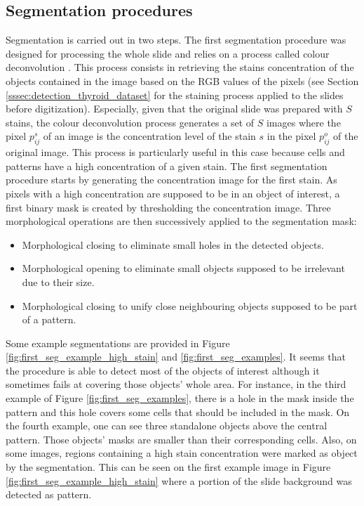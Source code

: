 \subsection{Segmentation procedures}
\label{ssec:segmentation_proc}
Segmentation is carried out in two steps. The first segmentation procedure was designed for processing the whole slide and relies on a process called colour deconvolution \cite{ruifrok2001quantification}. This process consists in retrieving the stains concentration of the objects contained in the image based on the RGB values of the pixels (see Section \ref{sssec:detection_thyroid_dataset} for the staining process applied to the slides before digitization). Especially, given that the original slide was prepared with $S$ stains, the colour deconvolution process generates a set of $S$ images where the pixel $p^s_{ij}$ of an image is the concentration level of the stain $s$ in the pixel $p^o_{ij}$ of the original image. This process is particularly useful in this case because cells and patterns have a high concentration of a given stain. The first segmentation procedure starts by generating the concentration image for the first stain. As pixels with a high concentration are supposed to be in an object of interest, a first binary mask is created by thresholding the concentration image. Three morphological operations are then successively applied to the segmentation mask:

\begin{itemize}
	\item Morphological closing to eliminate small holes in the detected objects.
	\item Morphological opening to eliminate small objects supposed to be irrelevant due to their size.
	\item Morphological closing to unify close neighbouring objects supposed to be part of a pattern.
\end{itemize}

Some example segmentations are provided in Figure \ref{fig:first_seg_example_high_stain} and \ref{fig:first_seg_examples}. It seems that the procedure is able to detect most of the objects of interest although it sometimes fails at covering those objects' whole area. For instance, in the third example of Figure \ref{fig:first_seg_examples}, there is a hole in the mask inside the pattern and this hole covers some cells that should be included in the mask. On the fourth example, one can see three standalone objects above the central pattern. Those objects' masks are smaller than their corresponding cells. Also, on some images, regions containing a high stain concentration were marked as object by the segmentation. This can be seen on the first example image in Figure \ref{fig:first_seg_example_high_stain} where a portion of the slide background was detected as pattern. 

